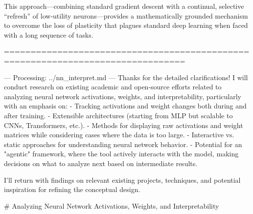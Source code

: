 This approach—combining standard gradient descent with a continual, selective “refresh” of low‐utility neurons—provides a mathematically grounded mechanism to overcome the loss of plasticity that plagues standard deep learning when faced with a long sequence of tasks.


================================================================================

--- Processing: ../nn_interpret.md ---
Thanks for the detailed clarifications! I will conduct research on existing academic and open-source efforts related to analyzing neural network activations, weights, and interpretability, particularly with an emphasis on:
- Tracking activations and weight changes both during and after training.
- Extensible architectures (starting from MLP but scalable to CNNs, Transformers, etc.).
- Methods for displaying raw activations and weight matrices while considering cases where the data is too large.
- Interactive vs. static approaches for understanding neural network behavior.
- Potential for an "agentic" framework, where the tool actively interacts with the model, making decisions on what to analyze next based on intermediate results.

I'll return with findings on relevant existing projects, techniques, and potential inspiration for refining the conceptual design.

# Analyzing Neural Network Activations, Weights, and Interpretability


